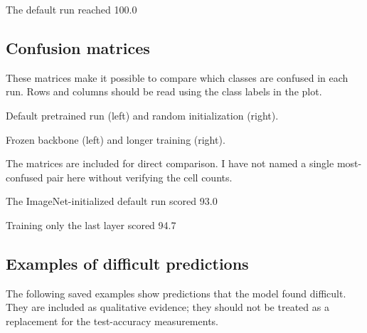 \documentclass[11pt]{article}
\begin{document}
The default run reached 100.0%

\subsection*{Confusion matrices}
These matrices make it possible to compare which classes are confused in each run. Rows and columns should be read using the class labels in the plot.

\begin{center}
\hfill
{}

\small Default pretrained run (left) and random initialization (right).
\end{center}

\begin{center}
\hfill
{}

\small Frozen backbone (left) and longer training (right).
\end{center}

The matrices are included for direct comparison. I have not named a single most-confused pair here without verifying the cell counts.

The ImageNet-initialized default run scored 93.0%

Training only the last layer scored 94.7%

\subsection*{Examples of difficult predictions}
The following saved examples show predictions that the model found difficult. They are included as qualitative evidence; they should not be treated as a replacement for the test-accuracy measurements.
\end{document}
